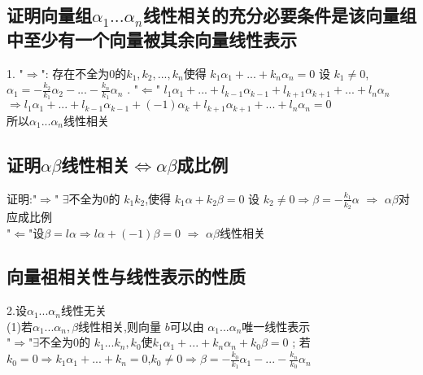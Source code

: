 \documentclass[a4paper,fleqn]{article}
\begin{document}
\subsection{证明向量组$\alpha_1...\alpha_n$线性相关的充分必要条件是该向量组中至少有一个向量被其余向量线性表示}
1. "$\Rightarrow$": 存在不全为0的$k_1,k_2,..., k_n$使得 $k_1\alpha_1+...+ k_n \alpha_n=0$ \qquad
设 $k_1\neq 0$,  $\alpha_1=-\frac{k_2}{k_1}\alpha_2-...-\frac{k_n}{k_1}\alpha_n$ . "$\Leftarrow$" $l_1\alpha_1+...+l_{k-1}\alpha_{k-1}+l_{k+1}\alpha_{k+1}+...+l_n\alpha_n$ \\
  $\Rightarrow l_1\alpha_1+...+l_{k-1}\alpha_{k-1}+(-1)\alpha_k+l_{k+1}\alpha_{k+1}+...+l_n\alpha_n=0$ \\ 
 所以$\alpha_1...\alpha_n$线性相关 \\ 
\subsection{证明$\alpha \beta$线性相关$\Leftrightarrow \alpha \beta$成比例}
证明:"$\Rightarrow$" $\exists$不全为0的 $k_1k_2$,使得
 $k_1\alpha+k_2\beta=0$\qquad
 设  $k_2\neq0 \Rightarrow \beta = - \frac{k_1}{k_2}\alpha$ $\Rightarrow$ $\alpha\beta$对应成比例 \\ 
 "$\Leftarrow$"设$\beta=l\alpha \Rightarrow l\alpha+(-1)\beta=0$\qquad 
  $\Rightarrow$  $\alpha \beta$线性相关 \\ 
\subsection{向量祖相关性与线性表示的性质}
2.设$\alpha_1...\alpha_n$线性无关 \\ 
(1)若$\alpha_1...\alpha_n,\beta$线性相关,则向量 $b$可以由 $\alpha_1...\alpha_n$唯一线性表示 \\ 
"$\Rightarrow$"$\exists$不全为0的 $k_1...k_n,k_0$使$k_1\alpha_1+...+k_n\alpha_n+k_0\beta=0$ ;\qquad 
若$k_0=0\Rightarrow k_1\alpha_1+...+k_n=0$,$k_0 \neq 0 \Rightarrow \beta=-\frac{k_0}{k_1}\alpha_1-...-\frac{k_n}{k_0}\alpha_n$ \\ 
\end{document}
